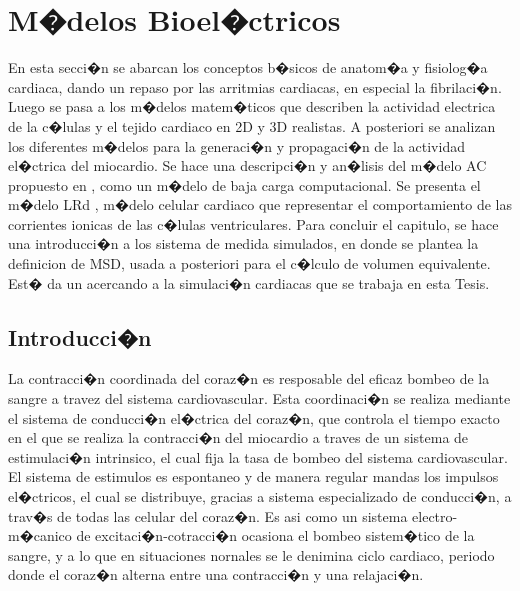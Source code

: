 \chapter{M�delos Bioel�ctricos}

\begin{resumen}
  En esta secci�n se abarcan los conceptos b�sicos de anatom�a y fisiolog�a
  cardiaca, dando un repaso por las arritmias cardiacas, en especial la
  fibrilaci�n. Luego se pasa a los m�delos matem�ticos que describen la
  actividad electrica de la c�lulas y el tejido  cardiaco en 2D y 3D realistas.
  A posteriori se analizan los diferentes m�delos para la generaci�n y
  propagaci�n de la actividad el�ctrica del miocardio. Se hace una descripci�n
  y an�lisis del m�delo \ac{AC} propuesto en \cite{Alonso-Atienza05},  como un
  m�delo de baja carga computacional. Se presenta el m�delo \ac{LRd}
  \cite{luo1994, livshitz2007}, m�delo celular cardiaco que representar el
  comportamiento de las corrientes ionicas de las c�lulas ventriculares. Para
  concluir el capitulo, se hace una introducci�n a los sistema de medida
  simulados, en donde se plantea la definicion de \ac{MSD}, usada a posteriori
  para el c�lculo de volumen equivalente. Est� da un acercando a la simulaci�n cardiacas que se trabaja en esta Tesis.
  
  
  
  
\end{resumen} 


\section{Introducci�n}

La contracci�n coordinada del coraz�n es resposable del eficaz bombeo de la
sangre a travez del sistema cardiovascular. Esta coordinaci�n se realiza
mediante el sistema de conducci�n el�ctrica del coraz�n, que controla el tiempo
exacto en el que se realiza la contracci�n del miocardio a traves de un sistema de
estimulaci�n intrinsico, el cual fija la tasa de bombeo del sistema
cardiovascular. El sistema de estimulos es espontaneo y de manera regular mandas
los impulsos el�ctricos, el cual se distribuye, gracias a sistema especializado
de conducci�n, a trav�s de todas las celular del coraz�n. Es asi como un sistema
electro-m�canico de excitaci�n-cotracci�n ocasiona el bombeo sistem�tico de la
sangre, y a lo que en situaciones nornales se le denimina ciclo cardiaco,
periodo donde el coraz�n alterna entre una contracci�n y una relajaci�n.


